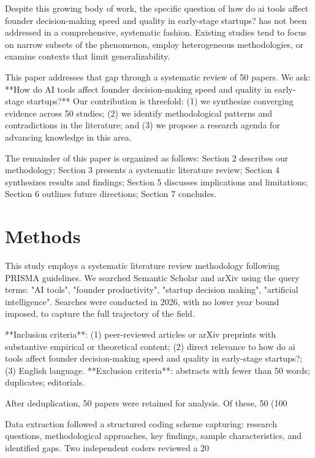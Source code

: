 \documentclass[11pt, a4paper]{article}
\begin{document}
Despite this growing body of work, the specific question of how do ai tools affect founder decision-making speed and quality in early-stage startups? has not been addressed in a comprehensive, systematic fashion. Existing studies tend to focus on narrow subsets of the phenomenon, employ heterogeneous methodologies, or examine contexts that limit generalizability.

This paper addresses that gap through a systematic review of 50 papers. We ask: **How do AI tools affect founder decision-making speed and quality in early-stage startups?** Our contribution is threefold: (1) we synthesize converging evidence across 50 studies; (2) we identify methodological patterns and contradictions in the literature; and (3) we propose a research agenda for advancing knowledge in this area.

The remainder of this paper is organized as follows: Section 2 describes our methodology; Section 3 presents a systematic literature review; Section 4 synthesizes results and findings; Section 5 discusses implications and limitations; Section 6 outlines future directions; Section 7 concludes.

\section{Methods}
This study employs a systematic literature review methodology following PRISMA guidelines. We searched Semantic Scholar and arXiv using the query terms: "AI tools", "founder productivity", "startup decision making", "artificial intelligence". Searches were conducted in 2026, with no lower year bound imposed, to capture the full trajectory of the field.

**Inclusion criteria**: (1) peer-reviewed articles or arXiv preprints with substantive empirical or theoretical content; (2) direct relevance to how do ai tools affect founder decision-making speed and quality in early-stage startups?; (3) English language. **Exclusion criteria**: abstracts with fewer than 50 words; duplicates; editorials.

After deduplication, 50 papers were retained for analysis. Of these, 50 (100%

Data extraction followed a structured coding scheme capturing: research questions, methodological approaches, key findings, sample characteristics, and identified gaps. Two independent coders reviewed a 20%
\end{document}
